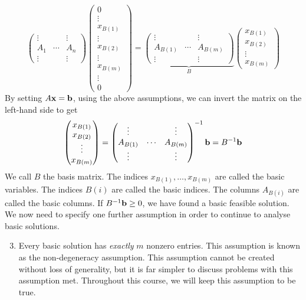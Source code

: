 \[
	\begin{pmatrix}
		\vdots &        & \vdots \\
		A_1    & \cdots & A_n    \\
		\vdots &        & \vdots
	\end{pmatrix} \begin{pmatrix}
		0 \\ \vdots \\ x_{B(1)} \\ \vdots \\ x_{B(2)} \\ \vdots \\ x_{B(m)} \\ \vdots \\ 0
	\end{pmatrix} = \underbrace{\begin{pmatrix}
			\vdots   &        & \vdots   \\
			A_{B(1)} & \cdots & A_{B(m)} \\
			\vdots   &        & \vdots
		\end{pmatrix}}_{B} \begin{pmatrix}
		x_{B(1)} \\
		x_{B(2)} \\
		\vdots   \\
		x_{B(m)}
	\end{pmatrix}
\]
By setting \( A \vb x = \vb b \), using the above assumptions, we can invert the matrix on the left-hand side to get
\[
	\begin{pmatrix}
		x_{B(1)} \\
		x_{B(2)} \\
		\vdots   \\
		x_{B(m)}
	\end{pmatrix} = \begin{pmatrix}
		\vdots   &        & \vdots   \\
		A_{B(1)} & \cdots & A_{B(m)} \\
		\vdots   &        & \vdots
	\end{pmatrix}^{-1} \vb b = B^{-1} \vb b
\]
We call \( B \) the basis matrix.
The indices \( x_{B(1)}, \dots, x_{B(m)} \) are called the basic variables.
The indices \( B(i) \) are called the basic indices.
The columns \( A_{B(i)} \) are called the basic columns.
If \( B^{-1} \vb b \geq 0 \), we have found a basic feasible solution.
We now need to specify one further assumption in order to continue to analyse basic solutions.
\begin{enumerate}[A:]
	\setcounter{enumi}{2}
	\item Every basic solution has \textit{exactly} \( m \) nonzero entries.
	      This assumption is known as the non-degeneracy assumption.
	      This assumption cannot be created without loss of generality, but it is far simpler to discuss problems with this assumption met.
	      Throughout this course, we will keep this assumption to be true.
\end{enumerate}

